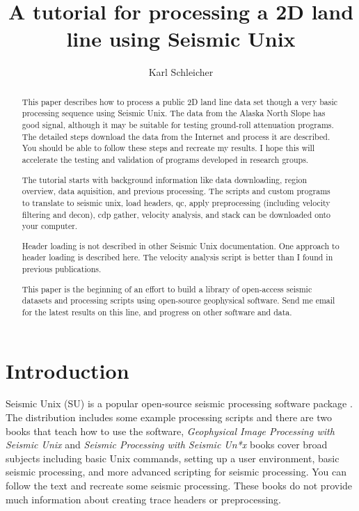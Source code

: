 
\title{A tutorial for processing a 2D land line using Seismic Unix}                                           %
\author{Karl Schleicher}

\maketitle

\begin{abstract}
This paper describes how to process a public 2D land line data set
though a very basic processing sequence using Seismic Unix. The data
from the Alaska North Slope has good signal, although it may be
suitable for testing ground-roll attenuation programs.  The detailed
steps download the data from the Internet and process it are
described.  You should be able to follow these steps and recreate my
results.  I hope this will accelerate the testing and validation of
programs developed in research groups.
\par
The tutorial starts with background information like data downloading,
region overview, data aquisition, and previous processing.  The
scripts and custom programs to translate to seismic unix, load
headers, qc, apply preprocessing (including velocity filtering and
decon), cdp gather, velocity analysis, and stack can be downloaded
onto your computer.

Header loading is not described in other Seismic Unix documentation.
One approach to header loading is described here.  The velocity
analysis script is better than I found in previous publications.

This paper is the beginning of an effort to build a library of
open-access seismic datasets and processing scripts using open-source
geophysical software. Send me email for the latest results on this line,
and progress on other software and data.
\end{abstract}

\section{Introduction}
Seismic Unix (SU) is a popular open-source seismic processing 
software package \cite[]{TLE16-07-10451049}.  The distribution includes some example processing
scripts and there are two books that teach how to use the software,
\emph{Geophysical Image Processing with Seismic Unix} \cite[]{stockwell} and
\emph{Seismic Processing with Seismic Un*x} \cite[]{forel} books cover broad
subjects including basic Unix commands, setting up a user environment,
basic seismic processing, and more advanced scripting for seismic
processing.  You can follow the text and recreate some seismic
processing.  These books do not provide much information about
creating trace headers or preprocessing.\nocite{cohen}

